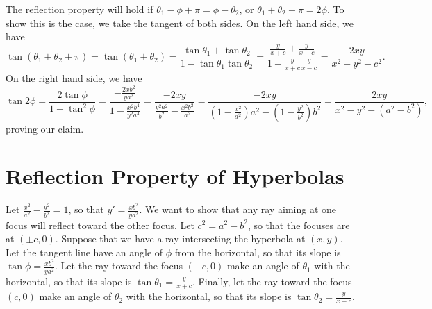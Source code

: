 \nofiles\documentclass{article}
\newcommand{\colorone}{blue}
\newcommand{\colortwo}{red}
\begin{document}
\begin{center}
\end{center}

The reflection property will hold if $\theta_1-\phi+\pi=\phi-\theta_2$, or $\theta_1+\theta_2+\pi=2\phi$.  To show this is the case, we take the tangent of both sides.  On the left hand side, we have
\[
 \tan(\theta_1+\theta_2+\pi)=\tan(\theta_1+\theta_2)
 =\frac{\tan\theta_1+\tan\theta_2}{1-\tan\theta_1\tan\theta_2}
 =\frac{\frac y{x+c}+\frac y{x-c}}{1-\frac y{x+c}\frac y{x-c}}
 =\frac{2xy}{x^2-y^2-c^2}.
\]
On the right hand side, we have
\[
 \tan2\phi=\frac{2\tan\phi}{1-\tan^2\phi}
 =\frac{-\frac{2xb^2}{ya^2}}{1-\frac{x^2b^4}{y^2a^4}}
 =\frac{-2xy}{\frac{y^2a^2}{b^2}-\frac{x^2b^2}{a^2}}
 =\frac{-2xy}{(1-\frac{x^2}{a^2})a^2-(1-\frac{y^2}{b^2})b^2}
 =\frac{2xy}{x^2-y^2-(a^2-b^2)},
\]
proving our claim.

\section{Reflection Property of Hyperbolas}

Let $\frac{x^2}{a^2}-\frac{y^2}{b^2}=1$, so that $y'=\frac{xb^2}{ya^2}$.  We want to show that any ray aiming at one focus will reflect toward the other focus.  Let $c^2=a^2-b^2$, so that the focuses are at $(\pm c,0)$.  Suppose that we have a ray intersecting the hyperbola at $(x,y)$.  Let the tangent line have an angle of $\phi$ from the horizontal, so that its slope is $\tan\phi=\frac{xb^2}{ya^2}$.  Let the ray toward the focus $(-c,0)$ make an angle of $\theta_1$ with the horizontal, so that its slope is $\tan\theta_1=\frac y{x+c}$.  Finally, let the ray toward the focus $(c,0)$ make an angle of $\theta_2$ with the horizontal, so that its slope is $\tan\theta_2=\frac y{x-c}$.
\end{document}
